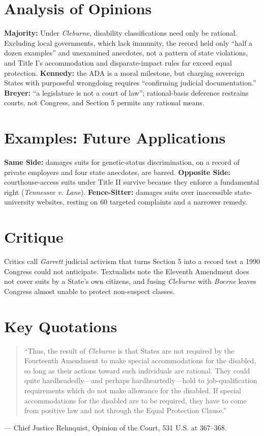 \documentclass[12pt]{article}
\begin{document}
\section{Analysis of Opinions}
\textbf{Majority:} Under \textit{Cleburne}, disability classifications need only be rational. Excluding local governments, which lack immunity, the record held only ``half a dozen examples'' and unexamined anecdotes, not a pattern of state violations, and Title I's accommodation and disparate-impact rules far exceed equal protection. \textbf{Kennedy:} the ADA is a moral milestone, but charging sovereign States with purposeful wrongdoing requires ``confirming judicial documentation.'' \textbf{Breyer:} ``a legislature is not a court of law''; rational-basis deference restrains courts, not Congress, and Section 5 permits any rational means.

\section{Examples: Future Applications}
\textbf{Same Side:} damages suits for genetic-status discrimination, on a record of private employers and four state anecdotes, are barred. \textbf{Opposite Side:} courthouse-access suits under Title II survive because they enforce a fundamental right (\textit{Tennessee v. Lane}). \textbf{Fence-Sitter:} damages suits over inaccessible state-university websites, resting on 60 targeted complaints and a narrower remedy.

\section{Critique}
Critics call \textit{Garrett} judicial activism that turns Section 5 into a record test a 1990 Congress could not anticipate. Textualists note the Eleventh Amendment does not cover suits by a State's own citizens, and fusing \textit{Cleburne} with \textit{Boerne} leaves Congress almost unable to protect non-suspect classes.

\section{Key Quotations}
\begin{quote}
``Thus, the result of \textit{Cleburne} is that States are not required by the Fourteenth Amendment to make special accommodations for the disabled, so long as their actions toward such individuals are rational. They could quite hardheadedly---and perhaps hardheartedly---hold to job-qualification requirements which do not make allowance for the disabled. If special accommodations for the disabled are to be required, they have to come from positive law and not through the Equal Protection Clause.''
\end{quote}
\noindent --- Chief Justice Rehnquist, Opinion of the Court, 531 U.S. at 367--368.
\end{document}
